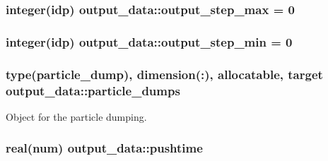 \subsubsection[{\texorpdfstring{output\+\_\+step\+\_\+max}{output_step_max}}]{\setlength{\rightskip}{0pt plus 5cm}integer(idp) output\+\_\+data\+::output\+\_\+step\+\_\+max = 0}\hypertarget{namespaceoutput__data_a310f5ada2926521513b808272a40764d}{}\label{namespaceoutput__data_a310f5ada2926521513b808272a40764d}
\subsubsection[{\texorpdfstring{output\+\_\+step\+\_\+min}{output_step_min}}]{\setlength{\rightskip}{0pt plus 5cm}integer(idp) output\+\_\+data\+::output\+\_\+step\+\_\+min = 0}\hypertarget{namespaceoutput__data_aea2eeeb3470d4377a87117bb1aeb2ae4}{}\label{namespaceoutput__data_aea2eeeb3470d4377a87117bb1aeb2ae4}
\subsubsection[{\texorpdfstring{particle\+\_\+dumps}{particle_dumps}}]{\setlength{\rightskip}{0pt plus 5cm}type({\bf particle\+\_\+dump}), dimension(\+:), allocatable, target output\+\_\+data\+::particle\+\_\+dumps}\hypertarget{namespaceoutput__data_a5fbbbcc739158cb15a4a02aa8bc63399}{}\label{namespaceoutput__data_a5fbbbcc739158cb15a4a02aa8bc63399}


Object for the particle dumping. 

\subsubsection[{\texorpdfstring{pushtime}{pushtime}}]{\setlength{\rightskip}{0pt plus 5cm}real(num) output\+\_\+data\+::pushtime}\hypertarget{namespaceoutput__data_a1616b369a6e32a80c9448bff6371d1cf}{}\label{namespaceoutput__data_a1616b369a6e32a80c9448bff6371d1cf}

